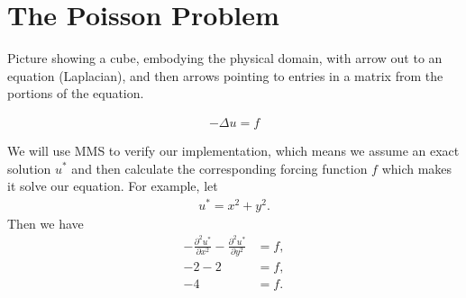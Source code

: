 \chapter{The Poisson Problem}

Picture showing a cube, embodying the physical domain, with arrow out to an equation (Laplacian), and then arrows pointing to entries in a matrix from the portions of the equation.

\begin{align}
  -\Delta u =  f
\end{align}

We will use MMS to verify our implementation, which means we assume an exact solution $u^*$ and then calculate the corresponding forcing function $f$ which makes it solve our equation. For example, let
\begin{align}
  u^* = x^2 + y^2.
\end{align}
Then we have
\begin{align}
  -\frac{\partial^2 u^*}{\partial x^2} - \frac{\partial^2 u^*}{\partial y^2} &= f, \\
  -2 - 2 &= f, \\
  -4     &= f.
\end{align}

